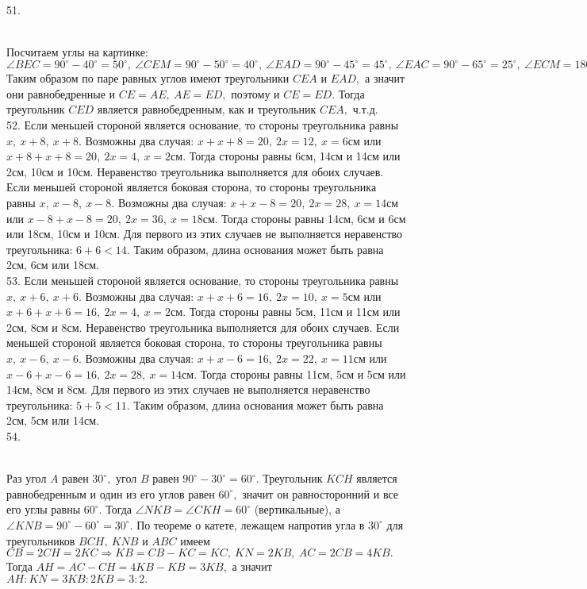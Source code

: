 51. \begin{figure}[ht!]
\end{figure}\\
Посчитаем углы на картинке: $\angle BEC=90^\circ-40^\circ=50^\circ,\ \angle CEM=90^\circ-50^\circ=40^\circ,\ \angle EAD=90^\circ-45^\circ=45^\circ,\ \angle EAC=90^\circ-65^\circ=25^\circ,\ \angle ECM=180^\circ-90^\circ-40^\circ-25^\circ=25^\circ.$ Таким образом по паре равных углов имеют треугольники $CEA$ и $EAD,$ а значит они равнобедренные и $CE=AE,\ AE=ED,$ поэтому и $CE=ED.$ Тогда треугольник $CED$ является равнобедренным, как и треугольник $CEA,$ ч.т.д.\\
52. Если меньшей стороной является основание, то стороны треугольника равны $x,\ x+8,\ x+8.$ Возможны два случая: $x+x+8=20,\ 2x=12,\ x=6$см или $x+8+x+8=20,\ 2x=4,\ x=2$см. Тогда стороны равны 6см, 14см и 14см или 2см, 10см и 10см. Неравенство треугольника выполняется для обоих случаев. Если меньшей стороной является боковая сторона, то стороны треугольника равны $x,\ x-8,\ x-8.$ Возможны два случая: $x+x-8=20,\ 2x=28,\ x=14$см или $x-8+x-8=20,\ 2x=36,\ x=18$см. Тогда стороны равны 14см, 6см и 6см или 18см, 10см и 10см. Для первого из этих случаев не выполняется неравенство треугольника: $6+6<14.$ Таким образом, длина основания может быть равна 2см, 6см или 18см.\\
53. Если меньшей стороной является основание, то стороны треугольника равны $x,\ x+6,\ x+6.$ Возможны два случая: $x+x+6=16,\ 2x=10,\ x=5$см или $x+6+x+6=16,\ 2x=4,\ x=2$см. Тогда стороны равны 5см, 11см и 11см или 2см, 8см и 8см. Неравенство треугольника выполняется для обоих случаев. Если меньшей стороной является боковая сторона, то стороны треугольника равны $x,\ x-6,\ x-6.$ Возможны два случая: $x+x-6=16,\ 2x=22,\ x=11$см или $x-6+x-6=16,\ 2x=28,\ x=14$см. Тогда стороны равны 11см, 5см и 5см или 14см, 8см и 8см. Для первого из этих случаев не выполняется неравенство треугольника: $5+5<11.$ Таким образом, длина основания может быть равна 2см, 5см или 14см.\\
54. \begin{figure}[ht!]
\end{figure}\\
Раз угол $A$ равен $30^\circ,$ угол $B$ равен $90^\circ-30^\circ=60^\circ.$ Треугольник $KCH$ является равнобедренным и один из его углов равен $60^\circ,$ значит он равносторонний и все его углы равны $60^\circ.$ Тогда $\angle NKB=\angle CKH=60^\circ$ (вертикальные), а $\angle KNB=90^\circ-60^\circ=30^\circ.$ По теореме о катете, лежащем напротив угла в $30^\circ$ для треугольников $BCH,\ KNB$ и $ABC$ имеем $CB=2CH=2KC\Rightarrow KB=CB-KC=KC,\ KN=2KB,\ AC=2CB=4KB.$ Тогда $AH=AC-CH=4KB-KB=3KB,$ а значит $AH:KN=3KB:2KB=3:2.$\\
